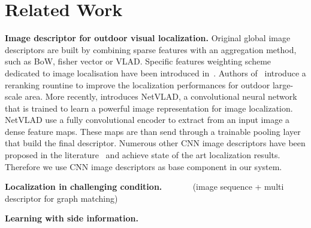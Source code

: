 \section{Related Work}
\label{sec:related_work}

\vspace{4pt}\noindent\textbf{Image descriptor for outdoor visual localization.} Original global image descriptors are built by combining sparse features with an aggregation method, such as BoW, fisher vector or VLAD. Specific features weighting scheme dedicated to image localisation have been introduced in~\cite{Arandjelovic2014}. Authors of~\cite{Sattler2016} introduce a reranking rountine to improve the localization performances for outdoor large-scale area. More recently, \cite{Arandjelovic2017} introduces NetVLAD, a convolutional neural network that is trained to learn a powerful image representation for image localization. NetVLAD use a fully convolutional encoder to extract from an input image a dense feature maps. These maps are than send through a trainable pooling layer that build the final descriptor. Numerous other CNN image descriptors have been proposed in the literature~\cite{Kim2017a,Gordo2017,Radenovic2017,Sunderhauf2015a,Liu2018} and achieve state of the art localization results. Therefore we use CNN image descriptors as base component in our system.

\vspace{4pt}\noindent\textbf{Localization in challenging condition.} ~\cite{Sattler2018} ~\cite{Torii2015} ~\cite{Porav2018} ~\cite{Naseer2018} (image sequence + multi descriptor for graph matching) ~\cite{Schonberger2018} ~\cite{Garg2018} ~\cite{Naseer2017a}

\vspace{4pt}\noindent\textbf{Learning with side information.} 
